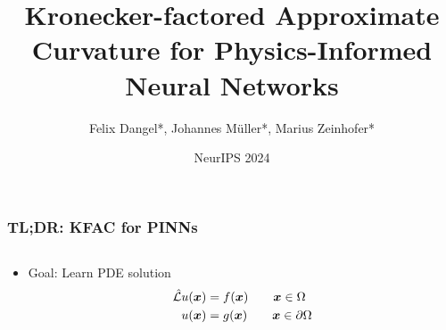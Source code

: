 \documentclass[12pt,usepdftitle=false,aspectratio=169]{beamer}
\title{%
  Kronecker-factored Approximate Curvature for Physics-Informed Neural Networks
}
\author{Felix Dangel*, Johannes M\"uller*, Marius Zeinhofer*}
\date{NeurIPS 2024}
\begin{document}
\makeTitleSlide

\begin{frame}
  \frametitle{TL;DR: KFAC for PINNs}
  \vspace{2ex}
  \begin{columns}
    \begin{column}[b]{0.37\linewidth}
      \begin{itemize}
      \item Goal: Learn PDE solution
        \begin{align*}
          \hat{{\mathcal{L}}} u({\bm{x}})
          &=
            f({\bm{x}}) \qquad {\bm{x}} \in \Omega
          \\
          u({\bm{x}})
          &=
            g({\bm{x}}) \qquad {\bm{x}} \in \partial \Omega
        \end{align*}


\end{itemize}
\end{column}
\end{columns}
\end{frame}
\end{document}
